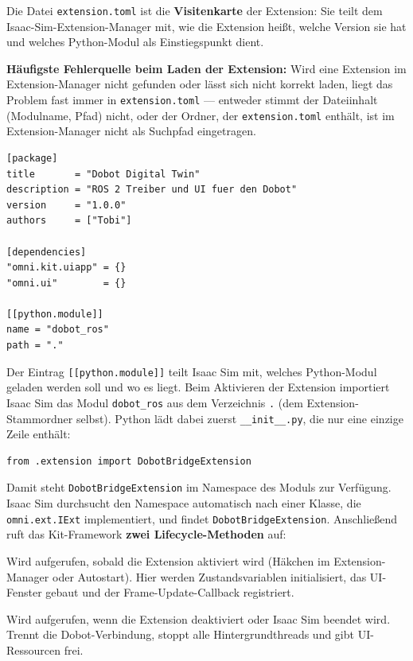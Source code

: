 \documentclass[11pt,a4paper]{article}
\begin{document}
Die Datei \texttt{extension.toml} ist die \textbf{Visitenkarte} der Extension:
Sie teilt dem Isaac-Sim-Extension-Manager mit, wie die Extension heißt,
welche Version sie hat und welches Python-Modul als Einstiegspunkt dient.

\begin{warnbox}
\textbf{Häufigste Fehlerquelle beim Laden der Extension:}
Wird eine Extension im Extension-Manager nicht gefunden oder lässt sich nicht
korrekt laden, liegt das Problem fast immer in \texttt{extension.toml} ---
entweder stimmt der Dateiinhalt (Modulname, Pfad) nicht, oder der
Ordner, der \texttt{extension.toml} enthält, ist im Extension-Manager
nicht als Suchpfad eingetragen.
\end{warnbox}

\begin{lstlisting}[style=batch, caption={extension.toml}]
[package]
title       = "Dobot Digital Twin"
description = "ROS 2 Treiber und UI fuer den Dobot"
version     = "1.0.0"
authors     = ["Tobi"]

[dependencies]
"omni.kit.uiapp" = {}
"omni.ui"        = {}

[[python.module]]
name = "dobot_ros"
path = "."
\end{lstlisting}

Der Eintrag \texttt{[[python.module]]} teilt Isaac Sim mit, welches
Python-Modul geladen werden soll und wo es liegt.
Beim Aktivieren der Extension importiert Isaac Sim das Modul
\texttt{dobot\_ros} aus dem Verzeichnis \texttt{.} (dem
Extension-Stammordner selbst). Python lädt dabei zuerst
\texttt{\_\_init\_\_.py}, die nur eine einzige Zeile enthält:

\begin{lstlisting}
from .extension import DobotBridgeExtension
\end{lstlisting}

Damit steht \texttt{DobotBridgeExtension} im Namespace des Moduls
zur Verfügung. Isaac Sim durchsucht den Namespace automatisch nach
einer Klasse, die \texttt{omni.ext.IExt} implementiert, und findet
\texttt{DobotBridgeExtension}. Anschließend ruft das Kit-Framework
\textbf{zwei Lifecycle-Methoden} auf:

\begin{description}[leftmargin=5cm, style=nextline]
  \item[\texttt{on\_startup(ext\_id)}]
    Wird aufgerufen, sobald die Extension aktiviert wird
    (Häkchen im Extension-Manager oder Autostart).
    Hier werden Zustandsvariablen initialisiert, das UI-Fenster
    gebaut und der Frame-Update-Callback registriert.
  \item[\texttt{on\_shutdown()}]
    Wird aufgerufen, wenn die Extension deaktiviert oder Isaac Sim
    beendet wird. Trennt die Dobot-Verbindung, stoppt alle
    Hintergrundthreads und gibt UI-Ressourcen frei.
\end{description}
\end{document}
